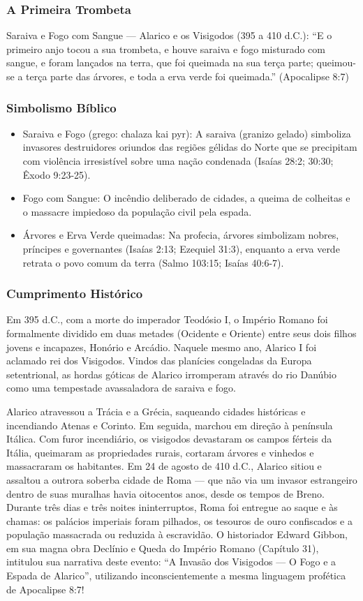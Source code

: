 \subsubsection*{A Primeira Trombeta}
Saraiva e Fogo com Sangue — Alarico e os Visigodos (395 a 410 d.C.):
``E o primeiro anjo tocou a sua trombeta, e houve saraiva e fogo misturado com sangue, e foram lançados na terra, que foi queimada na sua terça parte; queimou-se a terça parte das árvores, e toda a erva verde foi queimada.'' (Apocalipse 8:7)


\subsubsection*{Simbolismo Bíblico}
\begin{itemize}
  \item Saraiva e Fogo (grego: chalaza kai pyr): A saraiva (granizo gelado) simboliza invasores destruidores oriundos das regiões gélidas do Norte que se precipitam com violência irresistível sobre uma nação condenada (Isaías 28:2; 30:30; Êxodo 9:23-25).
  \item Fogo com Sangue: O incêndio deliberado de cidades, a queima de colheitas e o massacre impiedoso da população civil pela espada.
  \item Árvores e Erva Verde queimadas: Na profecia, árvores simbolizam nobres, príncipes e governantes (Isaías 2:13; Ezequiel 31:3), enquanto a erva verde retrata o povo comum da terra (Salmo 103:15; Isaías 40:6-7).
\end{itemize}



\subsubsection*{Cumprimento Histórico}
Em 395 d.C., com a morte do imperador Teodósio I, o Império Romano foi formalmente dividido em duas metades (Ocidente e Oriente) entre seus dois filhos jovens e incapazes, Honório e Arcádio. Naquele mesmo ano, Alarico I foi aclamado rei dos Visigodos. Vindos das planícies congeladas da Europa setentrional, as hordas góticas de Alarico irromperam através do rio Danúbio como uma tempestade avassaladora de saraiva e fogo.

Alarico atravessou a Trácia e a Grécia, saqueando cidades históricas e incendiando Atenas e Corinto. Em seguida, marchou em direção à península Itálica. Com furor incendiário, os visigodos devastaram os campos férteis da Itália, queimaram as propriedades rurais, cortaram árvores e vinhedos e massacraram os habitantes. Em 24 de agosto de 410 d.C., Alarico sitiou e assaltou a outrora soberba cidade de Roma — que não via um invasor estrangeiro dentro de suas muralhas havia oitocentos anos, desde os tempos de Breno. Durante três dias e três noites ininterruptos, Roma foi entregue ao saque e às chamas: os palácios imperiais foram pilhados, os tesouros de ouro confiscados e a população massacrada ou reduzida à escravidão. O historiador Edward Gibbon, em sua magna obra Declínio e Queda do Império Romano (Capítulo 31), intitulou sua narrativa deste evento: ``A Invasão dos Visigodos — O Fogo e a Espada de Alarico'', utilizando inconscientemente a mesma linguagem profética de Apocalipse 8:7!


